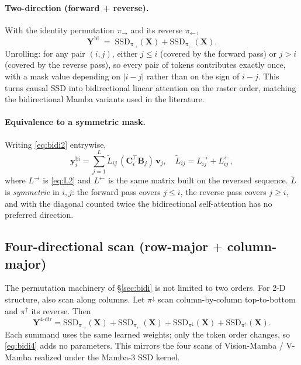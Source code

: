 \documentclass[11pt,a4paper]{article}
\begin{document}
\paragraph{Two-direction (forward + reverse).} With the identity
permutation $\pi_\to$ and its reverse $\pi_\leftarrow$,
\begin{equation}\label{eq:bidi2}
  \bm{Y}^{\text{bi}}
   \;=\; \mathrm{SSD}_{\pi_\to}(\bm{X}) + \mathrm{SSD}_{\pi_\leftarrow}(\bm{X}).
\end{equation}
Unrolling: for any pair $(i,j)$, either $j\le i$ (covered by the
forward pass) or $j>i$ (covered by the reverse pass), so every pair
of tokens contributes exactly once, with a mask value depending on
$|i-j|$ rather than on the sign of $i-j$. This turns causal SSD into
bidirectional linear attention on the raster order, matching the
bidirectional Mamba variants used in the literature.

\paragraph{Equivalence to a symmetric mask.} Writing
\eqref{eq:bidi2} entrywise,
\begin{equation}\label{eq:bidi-sym}
  \bm{y}_i^{\text{bi}} = \sum_{j=1}^{L} \widetilde{L}_{ij}\,
       (\bm{C}_i^\top\bm{B}_j)\,\bm{v}_j,
  \quad
  \widetilde{L}_{ij} = L_{ij}^{\to} + L_{ij}^{\leftarrow},
\end{equation}
where $L^\to$ is \eqref{eq:L2} and $L^\leftarrow$ is the same matrix
built on the reversed sequence. $\widetilde{L}$ is \emph{symmetric} in
$i,j$: the forward pass covers $j\le i$, the reverse pass covers
$j\ge i$, and with the diagonal counted twice the bidirectional
self-attention has no preferred direction.

\subsection{Four-directional scan (row-major \texorpdfstring{$+$}{+} column-major)}
\label{sec:4dir}

The permutation machinery of \S\ref{sec:bidi} is not limited to two orders.
For 2-D structure, also scan along columns. Let $\pi^\downarrow$ scan
column-by-column top-to-bottom and $\pi^\uparrow$ its reverse. Then
\begin{equation}\label{eq:bidi4}
  \bm{Y}^{\text{4-dir}}
   = \mathrm{SSD}_{\pi_\to}(\bm{X}) + \mathrm{SSD}_{\pi_\leftarrow}(\bm{X})
   + \mathrm{SSD}_{\pi^\downarrow}(\bm{X}) + \mathrm{SSD}_{\pi^\uparrow}(\bm{X}).
\end{equation}
Each summand uses the same learned weights; only the token order
changes, so \eqref{eq:bidi4} adds no parameters. This mirrors the
four scans of Vision-Mamba / V-Mamba realized under the Mamba-3 SSD
kernel.
\end{document}
